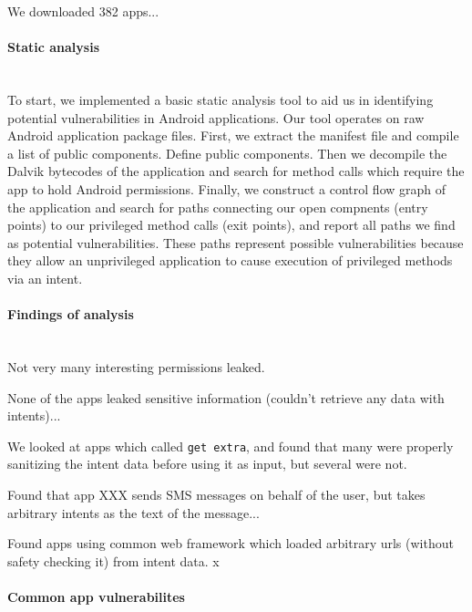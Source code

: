\documentclass[12pt,a4paper]{article}
\begin{document}
We downloaded 382 apps...

\paragraph{Static analysis} ~\\

To start, we implemented a basic static analysis tool to aid us in identifying
potential vulnerabilities in Android applications. Our tool operates on raw Android
application package files. First, we extract the manifest file and compile a
list of public components. Define public components. Then we decompile the
Dalvik bytecodes of the application and search for method calls which require
the app to hold Android permissions. Finally, we construct a control flow graph
of the application and search for paths connecting our open compnents (entry
points) to our privileged method calls (exit points), and report all paths we
find as potential vulnerabilities. These paths represent possible
vulnerabilities because they allow an unprivileged application to cause
execution of privileged methods via an intent.

\paragraph{Findings of analysis} ~\\

Not very many interesting permissions leaked.

None of the apps leaked sensitive information (couldn't retrieve any data with
intents)...

We looked at apps which called \texttt{get extra}, and found that many were
properly sanitizing the intent data before using it as input, but several were
not.

Found that app XXX sends SMS messages on behalf of the user, but takes arbitrary
intents as the text of the message...

Found apps using common web framework which loaded arbitrary urls (without
safety checking it) from intent data.
x
\paragraph{Common app vulnerabilites} ~\\
\end{document}
